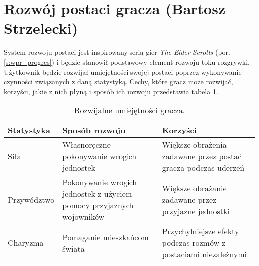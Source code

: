 \section{Rozwój postaci gracza (Bartosz Strzelecki)}\label{s:proj_progres}
System rozwoju postaci jest inspirowany serią gier \textit{The Elder Scrolls} (por. \ref{s:wpr_progres}) i będzie stanowił podstawowy element rozwoju toku rozgrywki.
Użytkownik będzie rozwijał umiejętności swojej postaci poprzez wykonywanie czynności związanych z daną statystyką.
Cechy, które gracz może rozwijać, korzyści, jakie z nich płyną i sposób ich rozwoju przedstawia tabela \ref{fig:prog}.

\begin{table}[h]
\caption{Rozwijalne umiejętności gracza.}
\begin{center}
  \begin{tabular}{ | m{10em} | m{10em} | m{10em} | }
  \hline
    Statystyka & Sposób rozwoju & Korzyści \\
  \hline\hline
    Siła & Własnoręczne pokonywanie wrogich jednostek & Większe obrażenia zadawane przez postać gracza podczas uderzeń \\
    \hline
    Przywództwo & Pokonywanie wrogich jednostek z użyciem pomocy przyjaznych wojowników & Większe obrażanie zadawane przez przyjazne jednostki \\
    \hline
    Charyzma & Pomaganie mieszkańcom świata & Przychylniejsze efekty podczas rozmów z postaciami niezależnymi \\
  \hline
  \end{tabular}
\end{center}
\label{fig:prog}
\end{table}
